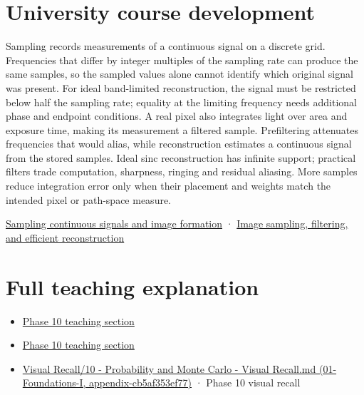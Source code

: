 \section{University course development}\label{appendix-6a7869dd79a6-university-course-development}

Sampling records measurements of a continuous signal on a discrete grid. Frequencies that differ by integer multiples of the sampling rate can produce the same samples, so the sampled values alone cannot identify which original signal was present. For ideal band-limited reconstruction, the signal must be restricted below half the sampling rate; equality at the limiting frequency needs additional phase and endpoint conditions. A real pixel also integrates light over area and exposure time, making its measurement a filtered sample. Prefiltering attenuates frequencies that would alias, while reconstruction estimates a continuous signal from the stored samples. Ideal sinc reconstruction has infinite support; practical filters trade computation, sharpness, ringing and residual aliasing. More samples reduce integration error only when their placement and weights match the intended pixel or path-space measure.

\href{Continuous\%20Notes/University\%20-\%20Worlds,\%20Images\%20and\%20Inference\%20-\%20Graphics,\%20Vision\%20and\%20Photography\#Sampling\%20continuous\%20signals\%20and\%20image\%20formation}{Sampling continuous signals and image formation} · \href{Continuous\%20Notes/University\%20-\%20Worlds,\%20Images\%20and\%20Inference\%20-\%20Graphics,\%20Vision\%20and\%20Photography\#Image\%20sampling,\%20filtering,\%20and\%20efficient\%20reconstruction}{Image sampling, filtering, and efficient reconstruction}

\section{Full teaching explanation}\label{appendix-6a7869dd79a6-full-teaching-explanation}

\begin{itemize}
\tightlist
\item
  \href{Continuous\%20Notes/Computing\%20Foundations\%20-\%20From\%20Bits\%20to\%20C++\%20and\%20Systems\%20APIs\#6.\%20A\%20computer\%20produces\%20deterministic\%20pseudorandom\%20sequences}{Phase 10 teaching section}
\item
  \href{Continuous\%20Notes/Computing\%20Foundations\%20-\%20From\%20Bits\%20to\%20C++\%20and\%20Systems\%20APIs\#8.\%20Monte\%20Carlo\%20estimates\%20trade\%20computation\%20for\%20uncertainty}{Phase 10 teaching section}
\item
  \href{../01-Foundations-I/main.pdf\#nameddest=appendix-cb5af353ef77}{Visual Recall/10 - Probability and Monte Carlo - Visual Recall.md (01-Foundations-I, appendix-cb5af353ef77)} · Phase 10 visual recall
\end{itemize}
